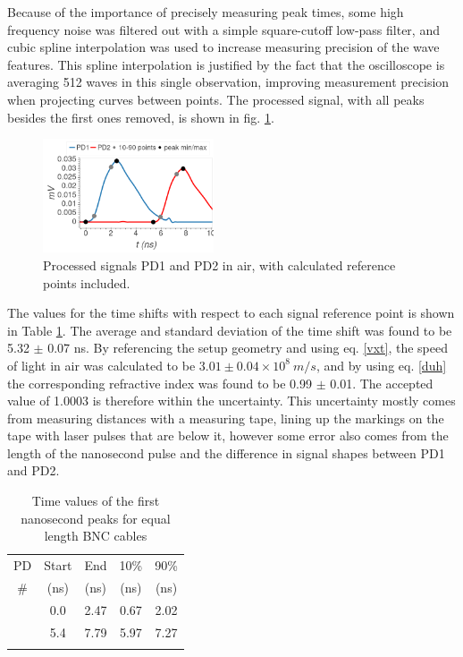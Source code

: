 \documentclass[aps,prl,reprint]{revtex4-2}
\begin{document}
Because of the importance of precisely measuring peak times,
some high frequency noise was filtered out with a simple square-cutoff low-pass filter,
and cubic spline interpolation was used to increase measuring precision of the wave 
features. This spline interpolation is justified by the fact that the oscilloscope is
averaging 512 waves in this single observation, improving measurement precision when
projecting curves between points. The processed signal, with all peaks besides the
first ones removed, is shown in fig. \ref{air_boke}. \\

\begin{figure}[h]
\includegraphics[width=0.45\textwidth]{../Images/l4_D_a.png}
\caption{\label{air_boke} Processed signals PD1 and PD2 in air, with calculated
reference points included.}
\end{figure}

The values for the time shifts with respect to each signal reference point is shown in
Table \ref{TD_D1}. The average and standard deviation of the time shift was found 
to be 5.32 $\pm$ 0.07 ns. By referencing the setup geometry and using eq. \ref{vxt}, the
speed of light in air was calculated to be $3.01 \pm 0.04 \times 10^8\ m/s$, and
by using eq. \ref{duh} the corresponding refractive index was found to be 0.99 $\pm$ 0.01.
The accepted value of 1.0003 is therefore within the uncertainty. This uncertainty
mostly comes from measuring distances with a measuring tape, lining up the markings
on the tape with laser pulses that are below it, however some error also comes from
the length of the nanosecond pulse and the difference in signal shapes between PD1 and PD2. \\

\begin{table}[h]
\renewcommand{\arraystretch}{1.35}
\setlength{\tabcolsep}{10pt}
\caption{\label{TD_D1}Time values of the first nanosecond peaks for equal length BNC cables}
\begin{tabular}{|c|c|c|c|c|}
\toprule
PD & Start & End & 10\% & 90\% \\
\# & (ns)& (ns)& (ns)& (ns)\\
\colrule
1 &    0.0 &  2.47 &  0.67 &  2.02 \\
\colrule
2 &    5.4 &  7.79 &  5.97 &  7.27 \\
\hline
\botrule
\end{tabular}
\end{table}
\end{document}
